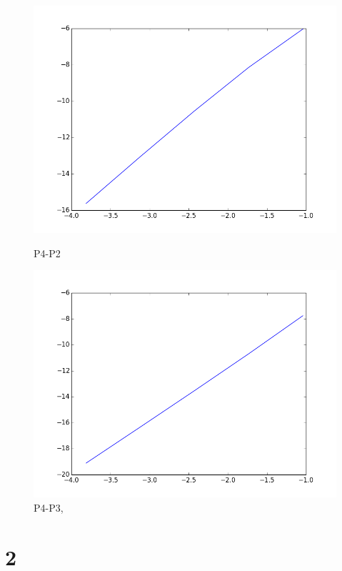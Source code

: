 \documentclass[a4paper,norsk]{article}
\begin{document}
\begin{figure}[h]
\begin{minipage}[b]{0.6\linewidth}
    \centering
    \includegraphics[scale=0.3]{wall_shear_log_plot_p4_p2.png}    
    \caption{P4-P2} 
    \vspace{4ex}
  \end{minipage}%
  \begin{minipage}[b]{0.6\linewidth}
    \centering
    \includegraphics[scale=0.3]{wall_shear_log_plot_p4_p3.png}    
    \caption{P4-P3, } 
    \vspace{4ex}
  \end{minipage} 
\end{figure}



\newpage
\section*{2}
\end{document}

